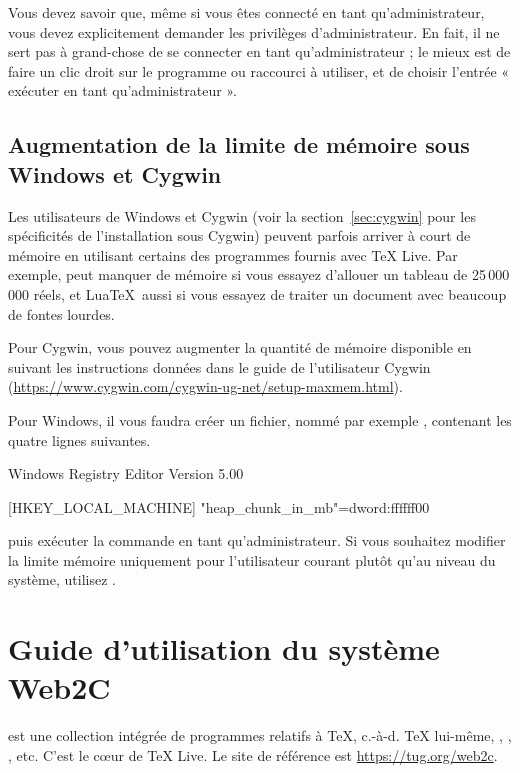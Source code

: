 \documentclass[german, english, french]{article}
\renewcommand{\TL}{\TeX{} Live\xspace}%
\begin{document}
Vous devez savoir que, même si vous êtes connecté en tant qu'administrateur,
vous devez explicitement demander les privilèges d'administrateur.  En fait, il
ne sert pas à grand-chose de se connecter en tant qu'administrateur ; le mieux
est de faire un clic droit sur le programme ou raccourci à utiliser, et de
choisir l'entrée « exécuter en tant qu'administrateur ».


\subsection{Augmentation de la limite de mémoire sous Windows et Cygwin}
\label{sec:cygwin-maxmem}

Les utilisateurs de Windows et Cygwin (voir la section~\ref{sec:cygwin} pour les
spécificités de l'installation sous Cygwin) peuvent parfois arriver à court de
mémoire en utilisant certains des programmes fournis avec \TL. Par exemple,
 peut manquer de mémoire si vous essayez d'allouer un tableau de
25\,000\,000 réels, et Lua\TeX\ aussi si vous essayez de traiter un document
avec beaucoup de fontes lourdes.

Pour Cygwin, vous pouvez augmenter la quantité de mémoire disponible en suivant
les instructions données dans le guide de l'utilisateur Cygwin
(\url{https://www.cygwin.com/cygwin-ug-net/setup-maxmem.html}).

Pour Windows, il vous faudra créer un fichier, nommé par exemple
, contenant les quatre lignes suivantes.

\begin{sverbatim}
Windows Registry Editor Version 5.00

[HKEY_LOCAL_MACHINE\Software\Cygwin]
"heap_chunk_in_mb"=dword:ffffff00
\end{sverbatim}

\noindent puis exécuter la commande  en tant
qu'administrateur. Si vous souhaitez modifier la limite mémoire uniquement pour
l'utilisateur courant plutôt qu'au niveau du système, utilisez
.


\section{Guide d'utilisation du système Web2C}

\Webc{} est une collection intégrée de programmes relatifs à \TeX,
c.-à-d. \TeX{} lui-même, \MF{}, \MP, \BibTeX{}, etc.  C'est le cœur de \TL{}. Le
site de référence est \url{https://tug.org/web2c}.
\end{document}
